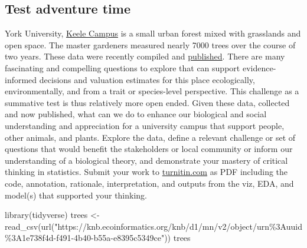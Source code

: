 \documentclass[
]{book}
\newenvironment{Shaded}{\begin{snugshade}}{\end{snugshade}}
\newcommand{\FunctionTok}[1]{\textcolor[rgb]{0.00,0.00,0.00}{#1}}
\newcommand{\NormalTok}[1]{#1}
\newcommand{\OtherTok}[1]{\textcolor[rgb]{0.56,0.35,0.01}{#1}}
\newcommand{\StringTok}[1]{\textcolor[rgb]{0.31,0.60,0.02}{#1}}
\begin{document}
\hypertarget{test-adventure-time}{%
\subsection*{Test adventure time}\label{test-adventure-time}}

York University, \href{https://en.wikipedia.org/wiki/Keele_Campus_(York_University)}{Keele Campus} is a small urban forest mixed with grasslands and open space. The master gardeners measured nearly 7000 trees over the course of two years. These data were recently compiled and \href{https://knb.ecoinformatics.org/view/doi\%3A10.5063\%2FQ81BGH}{published}. There are many fascinating and compelling questions to explore that can support evidence-informed decisions and valuation estimates for this place ecologically, environmentally, and from a trait or species-level perspective. This challenge as a summative test is thus relatively more open ended. Given these data, collected and now published, what can we do to enhance our biological and social understanding and appreciation for a university campus that support people, other animals, and plants. Explore the data, define a relevant challenge or set of questions that would benefit the stakeholders or local community or inform our understanding of a biological theory, and demonstrate your mastery of critical thinking in statistics. Submit your work to \href{https://www.turnitin.com}{turnitin.com} as PDF including the code, annotation, rationale, interpretation, and outputs from the viz, EDA, and model(s) that supported your thinking.

\begin{Shaded}
\begin{Highlighting}[]
\FunctionTok{library}\NormalTok{(tidyverse)}
\NormalTok{trees }\OtherTok{\textless{}{-}} \FunctionTok{read\_csv}\NormalTok{(}\FunctionTok{url}\NormalTok{(}\StringTok{"https://knb.ecoinformatics.org/knb/d1/mn/v2/object/urn\%3Auuid\%3A1e738f4d{-}f491{-}4b40{-}b55a{-}e8395c5349ce"}\NormalTok{))  }
\NormalTok{trees}
\end{Highlighting}
\end{Shaded}
\end{document}
